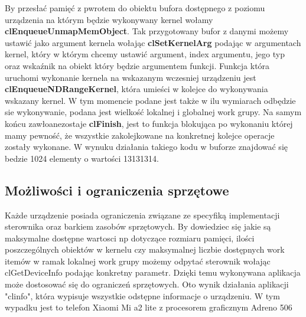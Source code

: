 By przesłać pamięć z pwrotem do obiektu bufora dostępnego z poziomu urządzenia na którym będzie wykonywany kernel wołamy \textbf{clEnqueueUnmapMemObject}.
Tak przygotowany bufor z danymi możemy ustawić jako argument kernela wołając \textbf{clSetKernelArg} podając w argumentach kernel, który w którym chcemy ustawić argument, index argumentu, jego typ oraz wskaźnik na obiekt który będzie argumentem funkcji.
Funkcja która uruchomi wykonanie kernela na wskazanym wczesniej urządzeniu jest \textbf{clEnqueueNDRangeKernel}, która umieści w kolejce do wykonywania wskazany kernel. W tym momencie podane jest także w ilu wymiarach odbędzie sie wykonywanie, podana jest wielkość lokalnej i globalnej work grupy.
Na samym końcu zawłoanezostaje \textbf{clFinish}, jest to funkcja blokująca po wykonaniu której mamy pewność, że wszystkie zakolejkowane na konkretnej kolejce operacje zostały wykonane.
W wynuku działania takiego kodu w buforze znajdować się bedzie 1024 elementy o wartości 13131314.
\subsection{Możliwości i ograniczenia sprzętowe}
Każde urządzenie posiada ograniczenia związane ze specyfiką implementacji sterownika oraz barkiem zasobów sprzętowych. By dowiedziec się jakie są maksymalne dostępne wartosci np dotyczące rozmiaru pamięci, ilości poszczególnych obiektów w kernelu czy maksymalnej liczbie dostępnych work itemów w ramak lokalnej work grupy możemy odpytać sterownik wołając clGetDeviceInfo podając konkretny parametr. Dzięki temu wykonywana aplikacja może dostosować się do ograniczeń sprzętowych. Oto wynik działania aplikacji "clinfo", która wypisuje wszystkie odstępne informacje o urządzeniu. W tym wypadku jest to telefon Xiaomi Mi a2 lite z procesorem graficznym Adreno 506
 
